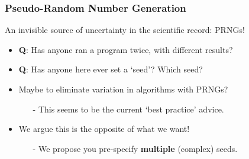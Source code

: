 \documentclass[12pt]{beamer}
\begin{document}
\begin{frame}
\frametitle{Pseudo-Random Number Generation}
An invisible source of uncertainty in the scientific record: PRNGs! \\ \vspace{.05in} \pause
	\begin{itemize}
		\item \textbf{Q}: Has anyone ran a program twice, with different results?\\ \vspace{.1in}\pause
		\item \textbf{Q}: Has anyone here ever set a `\color{myblue}seed\color{black}'? Which seed?\\ \vspace{.1in}\pause
		\item Maybe to eliminate variation in algorithms with PRNGs?\\ \vspace{.05in}
		\begin{itemize}
		\item[-] This seems to be the current `best practice' advice.\\ \vspace{.1in}  \pause
		\end{itemize}
			\item We argue this is the \color{myred}opposite of what we want\color{black}!\\ \vspace{.05in}
			\begin{itemize}
				\item[-] We propose you pre-specify \textbf{multiple} (complex) seeds.
			\end{itemize}
	\end{itemize}
\end{frame}
\end{document}
